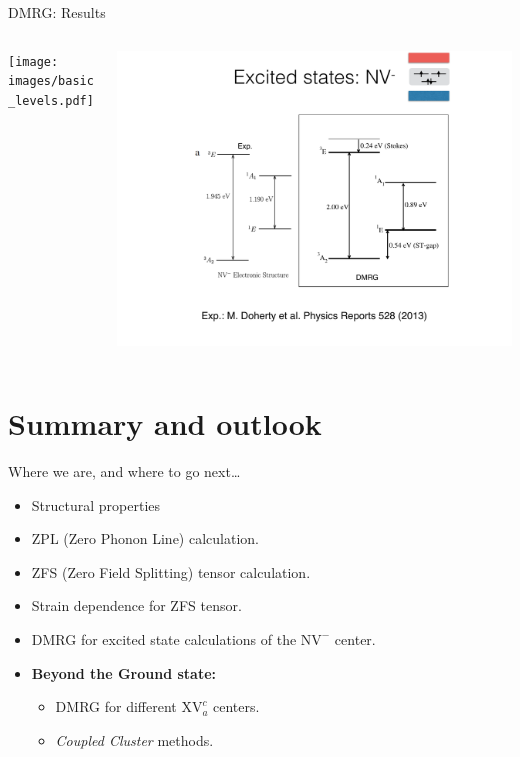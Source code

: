 \documentclass[notes=hide]{beamer}
\begin{document}
\begin{frame}{DMRG: Results}
  \begin{columns}
    \begin{column}{0.5\textwidth}
      \texttt{[image: images/basic\_levels.pdf]}
    \end{column}
    \begin{column}{0.5\textwidth}
      \includegraphics[width=1\textwidth, trim=500 200 190 200, clip]{images/dmrg_results.pdf}
    \end{column}
  \end{columns}
\end{frame}



\section{Summary and outlook} %




\begin{frame}{Where we are, and where to go next\ldots}
  \begin{itemize}
    \item Structural properties
    \item ZPL (Zero Phonon Line) calculation.
    \item ZFS (Zero Field Splitting) tensor calculation.
    \item Strain dependence for ZFS tensor.
    \item DMRG for excited state calculations of the $ \mathrm{NV}^{-} $ center.
    \item \textbf{Beyond the Ground state:}\\
      \begin{itemize}
        \item DMRG for different $ \mathrm{XV}^{c}_{a} $ centers.
        \item \textit{Coupled Cluster} methods.
      \end{itemize}
  \end{itemize}
\end{frame}



\end{document}
